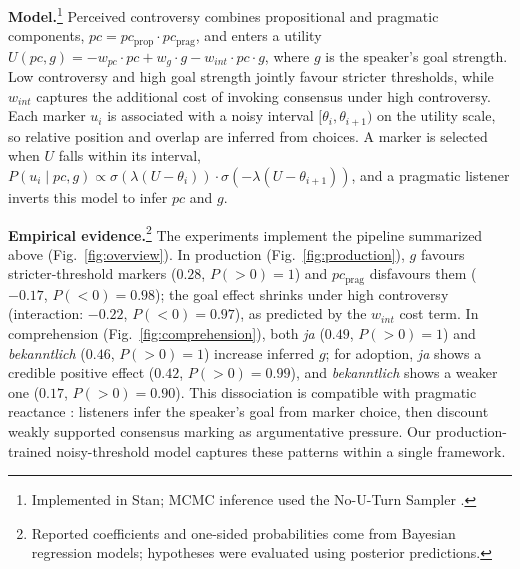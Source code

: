 \documentclass[11pt,a4paper]{article}
\begin{document}
\newpage
\textbf{Model.}\footnote{Implemented in Stan; MCMC inference used the No-U-Turn Sampler \citep{carpenter2017stan,hoffman2014nuts}.}
Perceived controversy combines propositional and pragmatic components, $pc = pc_{\text{prop}} \cdot pc_{\text{prag}}$, and enters a utility $U(pc, g) = -w_{pc} \cdot pc + w_g \cdot g - w_{int} \cdot pc \cdot g$, where $g$ is the speaker's goal strength.
Low controversy and high goal strength jointly favour stricter thresholds, while $w_{int}$ captures the additional cost of invoking consensus under high controversy.
Each marker $u_i$ is associated with a noisy interval $[\theta_i, \theta_{i+1})$ on the utility scale, so relative position and overlap are inferred from choices.
A marker is selected when $U$ falls within its interval, $P(u_i \mid pc, g) \propto \sigma(\lambda(U - \theta_i)) \cdot \sigma(-\lambda(U - \theta_{i+1}))$, and a pragmatic listener inverts this model to infer $pc$ and $g$.

\textbf{Empirical evidence.}\footnote{Reported coefficients and one-sided probabilities come from Bayesian regression models; hypotheses were evaluated using posterior predictions.}
The experiments implement the pipeline summarized above (Fig.~\ref{fig:overview}).
In production (Fig.~\ref{fig:production}), $g$ favours stricter-threshold markers ($0.28$, $P(>0) = 1$) and $pc_{\text{prag}}$ disfavours them ($-0.17$, $P(<0) = 0.98$); the goal effect shrinks under high controversy (interaction: $-0.22$, $P(<0) = 0.97$), as predicted by the $w_{int}$ cost term.
In comprehension (Fig.~\ref{fig:comprehension}), both \textit{ja} ($0.49$, $P(>0) = 1$) and \textit{bekanntlich} ($0.46$, $P(>0) = 1$) increase inferred $g$; for adoption, \textit{ja} shows a credible positive effect ($0.42$, $P(>0) = 0.99$), and \textit{bekanntlich} shows a weaker one ($0.17$, $P(>0) = 0.90$).
This dissociation is compatible with pragmatic reactance \citep{Brehm1966-BREATO-2}: listeners infer the speaker's goal from marker choice, then discount weakly supported consensus marking as argumentative pressure.
Our production-trained noisy-threshold model captures these patterns within a single framework.
\end{document}
